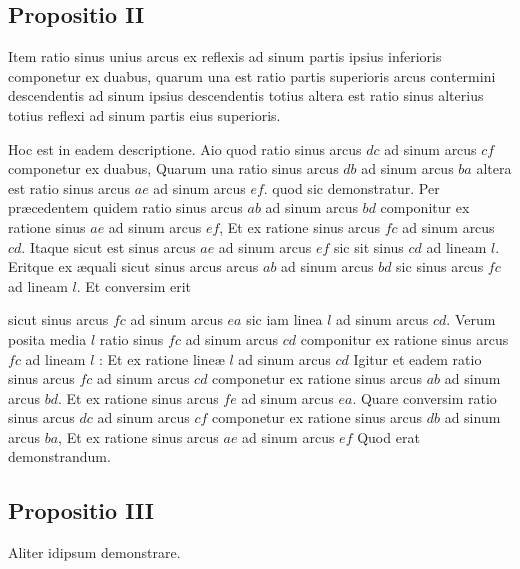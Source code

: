 \documentclass[11pt,a4paper]{article}
\begin{document}
\subsection*{Propositio II}

Item ratio sinus unius arcus ex reflexis ad sinum partis ipsius inferioris componetur ex duabus, quarum una est ratio partis superioris arcus contermini descendentis ad sinum ipsius descendentis totius altera est ratio sinus alterius totius reflexi ad sinum partis eius superioris.

Hoc est in eadem descriptione. Aio quod ratio sinus arcus $dc$ ad sinum arcus $cf$ componetur ex duabus, Quarum una  ratio sinus arcus $db$ ad sinum arcus $ba$ altera est ratio sinus arcus $ae$ ad sinum arcus $ef$. quod sic demonstratur. Per præcedentem quidem ratio sinus arcus $ab$ ad sinum arcus $bd$ componitur ex ratione sinus $ae$ ad sinum arcus $ef$, Et ex ratione sinus arcus $fc$ ad sinum arcus $cd$. Itaque sicut est sinus arcus $ae$ ad sinum arcus $ef$ sic sit sinus $cd$ ad lineam $l$. Eritque ex æquali sicut sinus arcus arcus $ab$ ad sinum arcus $bd$ sic sinus arcus $fc$ ad  lineam $l$. Et conversim erit

sicut sinus arcus $fc$ ad sinum arcus $ea$ sic iam linea $l$ ad sinum arcus $cd$. Verum posita media $l$ ratio sinus $fc$ ad sinum arcus $cd$ componitur ex ratione sinus arcus $fc$ ad lineam $l$ : Et ex ratione lineæ $l$ ad sinum arcus $cd$ Igitur et eadem ratio sinus arcus $fc$ ad sinum arcus $cd$ componetur ex ratione sinus arcus $ab$ ad sinum arcus $bd$. Et ex ratione sinus arcus $fe$ ad sinum arcus $ea$. Quare conversim ratio sinus arcus $dc$ ad sinum arcus $cf$ componetur ex ratione sinus arcus $db$ ad sinum arcus $ba$, Et ex ratione sinus arcus $ae$ ad sinum arcus $ef$ Quod erat demonstrandum.

\subsection*{Propositio III}

Aliter idipsum demonstrare.
\end{document}
